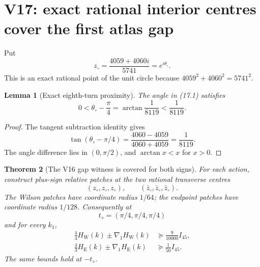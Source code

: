 \documentclass[11pt,oneside]{article}
\newtheorem{theorem}{Theorem}[section]
\newtheorem{lemma}[theorem]{Lemma}
\theoremstyle{definition}
\theoremstyle{remark}
\begin{document}
\section{V17: exact rational interior centres cover the first atlas gap}
\label{sec:newv17-interior}

Put
\[
 z_\circ=\frac{4059+4060i}{5741}=e^{i\theta_\circ}.
                                                               \tag{17.1}
\]
This is an exact rational point of the unit circle because
\(4059^2+4060^2=5741^2\).

\begin{lemma}[Exact eighth-turn proximity]
\label{lem:newv17-angle}
The angle in (17.1) satisfies
\[
 0<\theta_\circ-\frac{\pi}{4}
 =\arctan\frac1{8119}<\frac1{8119}.                       \tag{17.2}
\]
\end{lemma}

\begin{proof}
The tangent subtraction identity gives
\[
 \tan(\theta_\circ-\pi/4)
 =\frac{4060-4059}{4060+4059}=\frac1{8119}.               \tag{17.3}
\]
The angle difference lies in \((0,\pi/2)\), and
\(\arctan x<x\) for \(x>0\).
\end{proof}

\begin{theorem}[The V16 gap witness is covered for both signs]
\label{thm:newv17-gap-covered}
For each action, construct plus-sign relative patches at the two
rational transverse centres
\[
 (z_\circ,z_\circ,z_\circ),\qquad
 (\bar z_\circ,\bar z_\circ,\bar z_\circ).                \tag{17.4}
\]
The Wilson patches have coordinate radius \(1/64\); the endpoint
patches have coordinate radius \(1/128\).  Consequently at
\[
 t_\diamond=(\pi/4,\pi/4,\pi/4)                           \tag{17.5}
\]
and for every \(k_1\),
\[
\begin{aligned}
 \frac43H_{\mathrm W}(k)\pm\nabla_1H_{\mathrm W}(k)
 &\succeq\frac9{10000}I_{45},\\
 \frac43H_{\mathrm E}(k)\pm\nabla_1H_{\mathrm E}(k)
 &\succeq\frac1{50}I_{45}.
\end{aligned}                                             \tag{17.6}
\]
The same bounds hold at \(-t_\diamond\).
\end{theorem}
\end{document}
